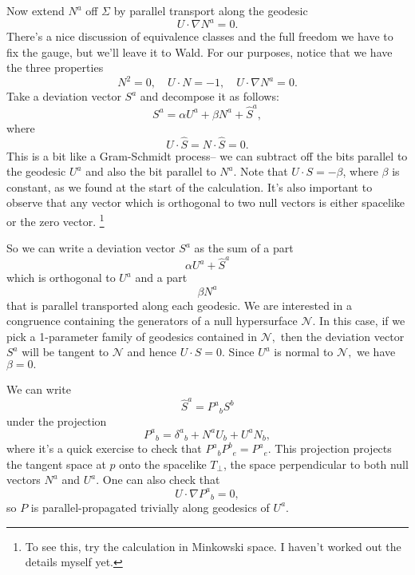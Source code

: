 Now extend $N^a$ off $\Sigma$ by parallel transport along the geodesic
\begin{equation}
    U\cdot \nabla N^a=0.
\end{equation}
There's a nice discussion of equivalence classes and the full freedom we have to fix the gauge, but we'll leave it to Wald. For our purposes, notice that we have the three properties
\begin{equation}
    N^2 = 0, \quad U\cdot N=-1,\quad U\cdot \nabla N^a=0.
\end{equation}
Take a deviation vector $S^a$ and decompose it as follows:
\begin{equation}
    S^a= \alpha U^a +\beta N^a + \hat S^a,
\end{equation}
where
\begin{equation}
    U\cdot \hat S = N\cdot \hat S=0.
\end{equation}
This is a bit like a Gram-Schmidt process-- we can subtract off the bits parallel to the geodesic $U^a$ and also the bit parallel to $N^a$.
Note that $U\cdot S=-\beta$, where $\beta$ is constant, as we found at the start of the calculation. It's also important to observe that any vector which is orthogonal to two null vectors is either spacelike or the zero vector.%
    \footnote{To see this, try the calculation in Minkowski space. I haven't worked out the details myself yet.}

So we can write a deviation vector $S^a$ as the sum of a part
\begin{equation*}
    \alpha U^a + \hat S^a
\end{equation*}
which is orthogonal to $U^a$ and a part
\begin{equation*}
    \beta N^a
\end{equation*}
that is parallel transported along each geodesic.
We are interested in a congruence containing the generators of a null hypersurface $\mathcal{N}$. In this case, if we pick a 1-parameter family of geodesics contained in $\mathcal{N},$ then the deviation vector $S^a$ will be tangent to $\mathcal{N}$ and hence $U\cdot S=0$. Since $U^a$ is normal to $\mathcal{N},$ we have $\beta=0.$

We can write
\begin{equation}
    \hat S^a = P^a{}_b S^b
\end{equation}
under the projection
\begin{equation}
    P^a{}_b = \delta^a{}_b + N^a U_b + U^a N_b,
\end{equation}
where it's a quick exercise to check that $P^a{}_b P^b{}_e = P^a{}_e.$ This projection projects the tangent space at $p$ onto the spacelike $T_\perp$, the space perpendicular to both null vectors $N^a$ and $U^a$.
One can also check that
\begin{equation}
    U\cdot \nabla P^a{}_b =0,
\end{equation}
so $P$ is parallel-propagated trivially along geodesics of $U^a$.

